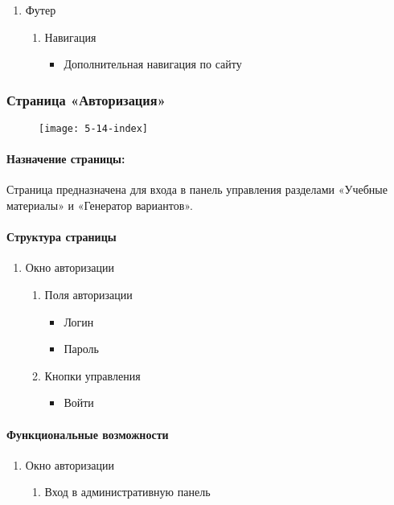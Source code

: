 \begin{enumerate}
	\item Футер
	\begin{enumerate}
		\item Навигация
		\begin{itemize}
			\item Дополнительная навигация по сайту
		\end{itemize}
	\end{enumerate}
\end{enumerate}


\subsubsection{Страница «Авторизация»}
\begin{figure}[H]
	\texttt{[image: 5-14-index]}
\end{figure}
\paragraph{Назначение страницы:} Страница предназначена для входа в панель управления разделами «Учебные материалы» и «Генератор вариантов».

\paragraph{Структура страницы}
\begin{enumerate}
	\item Окно авторизации
	\begin{enumerate}
		\item Поля авторизации
		\begin{itemize}
		\item Логин
		\item Пароль
		\end{itemize}
		\item Кнопки управления
		\begin{itemize}
		\item Войти
		\end{itemize}
	\end{enumerate}
\end{enumerate}

\paragraph{Функциональные возможности}
\begin{enumerate}
	\item Окно авторизации
	\begin{enumerate}
		\item Вход в административную панель
	\end{enumerate}
\end{enumerate}


